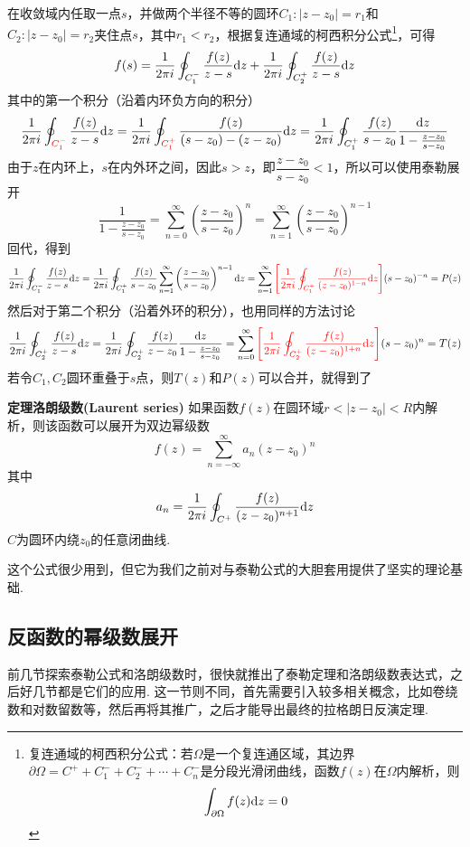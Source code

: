 \documentclass[UTF8]{ctexart}
\newcommand{\trm}[1]{{\rm #1}}
\newenvironment{theorem}[1]
    {\begin{tcolorbox}[enhanced, colback=LightYellow, breakable=true, frame hidden, borderline west={1.5mm}{-2mm}{DarkBlue}]
    {\bfseries {\color{DarkBlue} 定理}\quad #1} \newline}
    {\end{tcolorbox}}
\begin{document}
在收敛域内任取一点\(s\)，并做两个半径不等的圆环\(C_1:|z-z_0|=r_1\)和\(C_2:|z-z_0|=r_2\)夹住点\(s\)，其中\(r_1<r_2\)，根据复连通域的柯西积分公式\footnote{复连通域的柯西积分公式：若\(\Omega\)是一个复连通区域，其边界\(\partial \Omega = C^++C_1^-+C_2^-+\cdots+C_n^-\)是分段光滑闭曲线，函数\(f(z)\)在\(\Omega\)内解析，则\[\int_{\partial \Omega}f(z)\trm{d}z=0\]}，可得
\[f(s) = \frac{1}{2\pi i}\oint_{C_1^-}\frac{f(z)}{z-s}\trm{d}z + \frac{1}{2\pi i}\oint_{C_2^+}\frac{f(z)}{z-s}\trm{d}z\]
其中的第一个积分（沿着内环负方向的积分）
\[\frac{1}{2\pi i}\oint_{\color{red} C_1^-}\frac{f(z)}{z-s}\trm{d}z = \frac{1}{2\pi i}\oint_{\color{red} C_1^+}\frac{f(z)}{(s-z_0)-(z-z_0)}\trm{d}z = \frac{1}{2\pi i}\oint_{C_1^+}\frac{f(z)}{s-z_0}\frac{\trm{d}z}{1-\frac{z-z_0}{s-z_0}}\]
由于\(z\)在内环上，\(s\)在内外环之间，因此\(s>z\)，即\(\dfrac{z-z_0}{s-z_0}<1\)，所以可以使用泰勒展开
\[\frac{1}{1-\frac{z-z_0}{s-z_0}} = \sum_{n=0}^{\infty}\left(\frac{z-z_0}{s-z_0}\right)^{n} = \sum_{n=1}^{\infty}\left(\frac{z-z_0}{s-z_0}\right)^{n-1}\]
回代，得到
\[\frac{1}{2\pi i}\oint_{C_1^-}\frac{f(z)}{z-s}\trm{d}z = \frac{1}{2\pi i}\oint_{C_1^+}\frac{f(z)}{s-z_0}\sum_{n=1}^{\infty}\left(\frac{z-z_0}{s-z_0}\right)^{n-1}\trm{d}z = \sum_{n=1}^{\infty}{\color{red}\left[\frac{1}{2\pi i}\oint_{C_1^+}\frac{f(z)}{(z-z_0)^{1-n}}\trm{d}z\right]}(s-z_0)^{-n} = P(z)\]
然后对于第二个积分（沿着外环的积分），也用同样的方法讨论
\[\frac{1}{2\pi i}\oint_{C_2^+}\frac{f(z)}{z-s}\trm{d}z = \frac{1}{2\pi i}\oint_{C_2^+}\frac{f(z)}{z-z_0}\frac{\trm{d}z}{1-\frac{z-z_0}{s-z_0}} = \sum_{n=0}^{\infty}{\color{red}\left[\frac{1}{2\pi i}\oint_{C_2^+}\frac{f(z)}{(z-z_0)^{1+n}}\trm{d}z\right]}(s-z_0)^{n} = T(z)\]
若令\(C_1,C_2\)圆环重叠于\(s\)点，则\(T(z)\)和\(P(z)\)可以合并，就得到了
\begin{theorem}{洛朗级数(Laurent series)}
    如果函数\(f(z)\)在圆环域\(r<|z-z_0|<R\)内解析，则该函数可以展开为双边幂级数
    \[f(z) = \sum_{n=-\infty}^{\infty}a_n(z-z_0)^n\]
    其中
    \[a_n=\frac{1}{2\pi i}\oint_{C^+}\frac{f(z)}{(z-z_0)^{n+1}}\trm{d}z\]
    \(C\)为圆环内绕\(z_0\)的任意闭曲线.
\end{theorem}
这个公式很少用到，但它为我们之前对与泰勒公式的大胆套用提供了坚实的理论基础.

\subsection{反函数的幂级数展开}

前几节探索泰勒公式和洛朗级数时，很快就推出了泰勒定理和洛朗级数表达式，之后好几节都是它们的应用. 这一节则不同，首先需要引入较多相关概念，比如卷绕数和对数留数等，然后再将其推广，之后才能导出最终的拉格朗日反演定理.
\end{document}
